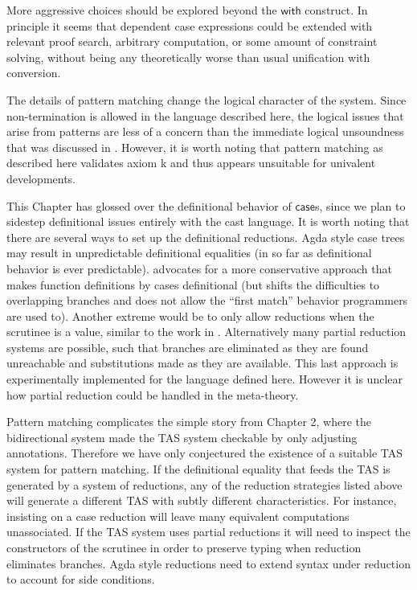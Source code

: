 More aggressive choices should be explored beyond the $\mathsf{with}$ construct.
In principle it seems that dependent case expressions could be extended with relevant proof search, arbitrary computation, or some amount of constraint solving, without being any theoretically worse than usual unification with conversion. 



The details of pattern matching change the logical character of the system\cite{cockx_devriese_2018}.
Since non-termination is allowed in the language described here, the logical issues that arise from patterns are less of a concern than the immediate logical unsoundness that was discussed in .
However, it is worth noting that pattern matching as described here validates axiom k and thus appears unsuitable for univalent developments.%

This Chapter has glossed over the definitional behavior of $\mathsf{case}$s, since we plan to sidestep definitional issues entirely with the cast language.
It is worth noting that there are several ways to set up the definitional reductions.
Agda style case trees may result in unpredictable definitional equalities (in so far as definitional behavior is ever predictable).
\cite{10.1007/978-3-642-54833-8_6} advocates for a more conservative approach that makes function definitions by cases definitional (but shifts the difficulties to overlapping branches and does not allow the ``first match'' behavior programmers are used to).
Another extreme would be to only allow reductions when the scrutinee is a value, similar to the work in \cite{sjoberg2012irrelevance}.
Alternatively many partial reduction systems are possible, such that branches are eliminated as they are found unreachable and substitutions made as they are available.
This last approach is experimentally implemented for the language defined here.
However it is unclear how partial reduction could be handled in the meta-theory.

Pattern matching complicates the simple story from Chapter 2, where the bidirectional system made the TAS system checkable by only adjusting annotations.
Therefore we have only conjectured the existence of a suitable TAS system for pattern matching.
If the definitional equality that feeds the TAS is generated by a system of reductions, any of the reduction strategies listed above will generate a different TAS with subtly different characteristics.
For instance, insisting on a \cbv{} case reduction will leave many equivalent computations unassociated.
If the TAS system uses partial reductions it will need to inspect the constructors of the scrutinee in order to preserve typing when reduction eliminates branches.
Agda style reductions need to extend syntax under reduction to account for side conditions. 

